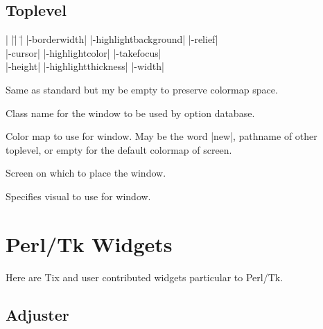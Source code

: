 \subsection*{Toplevel}
\vspace{-4pt}

\begin{tabbing}
|                   |\=|                     |\= \kill
|-borderwidth| \> |-highlightbackground|     \> |-relief| \\   
|-cursor|      \> |-highlightcolor|          \> |-takefocus| \\
|-height|      \> |-highlightthickness|      \> |-width| \\
\end{tabbing}

\vskip5pt
\begin{enum}{1cm}

Same as standard but my be empty to preserve colormap space.

Class name for the window to be used by option database.

Color map to use for window. May be the word |new|, pathname of
other toplevel, or empty for the default colormap of screen.

Screen on which to place the window.
 
Specifies visual to use for window.

\end{enum}

\newpage{





}

\section{Perl/Tk Widgets}

Here are Tix and user contributed widgets particular to Perl/Tk.

\subsection*{Adjuster}
\vspace{-4pt}

